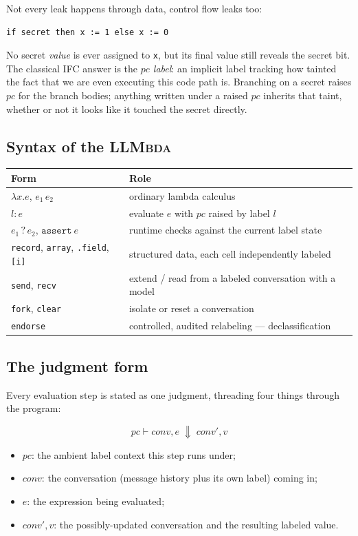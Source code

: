 \documentclass[11pt, a4paper]{article}
\newcommand{\bigstep}{\Downarrow}
\newcommand{\LLMbda}{\textsc{LLMbda}\xspace}
\begin{document}
Not every leak happens through data, control flow leaks too:

\begin{lstlisting}
if secret then x := 1 else x := 0
\end{lstlisting}

No secret \emph{value} is ever assigned to \texttt{x}, but its final value
still reveals the secret bit. The classical IFC answer is the \emph{$pc$
label}: an implicit label tracking how tainted the fact that we are even
executing this code path is. Branching on a secret raises $pc$ for the
branch bodies; anything written under a raised $pc$ inherits that taint,
whether or not it looks like it touched the secret directly.

\subsection{Syntax of the \LLMbda}

\begin{tabular}{@{}ll@{}}
\toprule
Form & Role \\
\midrule
$\lambda x.e$, $e_1\,e_2$ & ordinary lambda calculus \\
$l : e$ & evaluate $e$ with $pc$ raised by label $l$ \\
$e_1 \mathbin{?} e_2$, $\mathtt{assert}\ e$ & runtime checks against the current label state \\
\texttt{record}, \texttt{array}, \texttt{.field}, \texttt{[i]} & structured data, each cell independently labeled \\
\texttt{send}, \texttt{recv} & extend / read from a labeled conversation with a model \\
\texttt{fork}, \texttt{clear} & isolate or reset a conversation \\
\texttt{endorse} & controlled, audited relabeling --- declassification \\
\bottomrule
\end{tabular}

\subsection{The judgment form}

Every evaluation step is stated as one judgment, threading four things
through the program:

\[
pc \vdash \mathit{conv}, e \;\bigstep\; \mathit{conv}', v
\]

\begin{itemize}
  \item $pc$: the ambient label context this step runs under;
  \item $\mathit{conv}$: the conversation (message history plus its own
    label) coming in;
  \item $e$: the expression being evaluated;
  \item $\mathit{conv}', v$: the possibly-updated conversation and the
    resulting labeled value.
\end{itemize}
\end{document}
